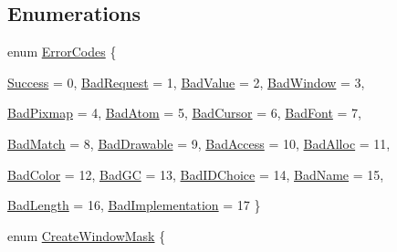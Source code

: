 \subsection*{Enumerations}
\begin{DoxyCompactItemize}
\item 
enum \hyperlink{namespace_tao_1_1_platform_1_1_x11_abcabcee3e3b6720203f647b523289f9b}{ErrorCodes} \{ \par
\hyperlink{namespace_tao_1_1_platform_1_1_x11_abcabcee3e3b6720203f647b523289f9b}{Success} =  0, 
\hyperlink{namespace_tao_1_1_platform_1_1_x11_abcabcee3e3b6720203f647b523289f9b}{BadRequest} =  1, 
\hyperlink{namespace_tao_1_1_platform_1_1_x11_abcabcee3e3b6720203f647b523289f9b}{BadValue} =  2, 
\hyperlink{namespace_tao_1_1_platform_1_1_x11_abcabcee3e3b6720203f647b523289f9b}{BadWindow} =  3, 
\par
\hyperlink{namespace_tao_1_1_platform_1_1_x11_abcabcee3e3b6720203f647b523289f9b}{BadPixmap} =  4, 
\hyperlink{namespace_tao_1_1_platform_1_1_x11_abcabcee3e3b6720203f647b523289f9b}{BadAtom} =  5, 
\hyperlink{namespace_tao_1_1_platform_1_1_x11_abcabcee3e3b6720203f647b523289f9b}{BadCursor} =  6, 
\hyperlink{namespace_tao_1_1_platform_1_1_x11_abcabcee3e3b6720203f647b523289f9b}{BadFont} =  7, 
\par
\hyperlink{namespace_tao_1_1_platform_1_1_x11_abcabcee3e3b6720203f647b523289f9b}{BadMatch} =  8, 
\hyperlink{namespace_tao_1_1_platform_1_1_x11_abcabcee3e3b6720203f647b523289f9b}{BadDrawable} =  9, 
\hyperlink{namespace_tao_1_1_platform_1_1_x11_abcabcee3e3b6720203f647b523289f9b}{BadAccess} =  10, 
\hyperlink{namespace_tao_1_1_platform_1_1_x11_abcabcee3e3b6720203f647b523289f9b}{BadAlloc} =  11, 
\par
\hyperlink{namespace_tao_1_1_platform_1_1_x11_abcabcee3e3b6720203f647b523289f9b}{BadColor} =  12, 
\hyperlink{namespace_tao_1_1_platform_1_1_x11_abcabcee3e3b6720203f647b523289f9b}{BadGC} =  13, 
\hyperlink{namespace_tao_1_1_platform_1_1_x11_abcabcee3e3b6720203f647b523289f9b}{BadIDChoice} =  14, 
\hyperlink{namespace_tao_1_1_platform_1_1_x11_abcabcee3e3b6720203f647b523289f9b}{BadName} =  15, 
\par
\hyperlink{namespace_tao_1_1_platform_1_1_x11_abcabcee3e3b6720203f647b523289f9b}{BadLength} =  16, 
\hyperlink{namespace_tao_1_1_platform_1_1_x11_abcabcee3e3b6720203f647b523289f9b}{BadImplementation} =  17
 \}
\item 
enum \hyperlink{namespace_tao_1_1_platform_1_1_x11_ad5522246b4d14bdf01cdeccf2b0b1e90}{CreateWindowMask} \{ \par

\end{DoxyCompactItemize}
